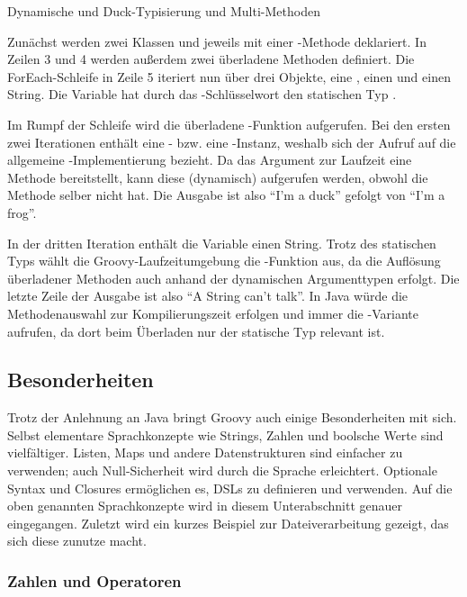 \documentclass[a4paper]{article}
\newcommand{\outquote}[1]{``{#1}''}
\newcommand{\codelisting}[3]{\begin{listing}[htp]
	\inputminted{#1}{#1/#2}
	\vspace{-3ex}
	\caption{#3}
	\label{lst:#2}
\end{listing}}
\begin{document}
\codelisting{groovy}{dynamic-typing.groovy}{Dynamische und Duck-Typisierung und Multi-Methoden}

Zunächst werden zwei Klassen  und  jeweils mit einer -Methode deklariert.
In Zeilen 3 und 4 werden außerdem zwei überladene Methoden  definiert.
Die ForEach-Schleife in Zeile 5 iteriert nun über drei Objekte, eine , einen  und einen String.
Die Variable  hat durch das -Schlüsselwort den statischen Typ .

Im Rumpf der Schleife wird die überladene -Funktion aufgerufen.
Bei den ersten zwei Iterationen enthält  eine - bzw. eine -Instanz, weshalb sich der Aufruf auf die allgemeine -Implementierung bezieht.
Da das Argument zur Laufzeit eine Methode  bereitstellt, kann diese (dynamisch) aufgerufen werden, obwohl  die Methode selber nicht hat.
Die Ausgabe ist also \outquote{I'm a duck} gefolgt von \outquote{I'm a frog}.

In der dritten Iteration enthält die Variable  einen String.
Trotz des statischen Typs  wählt die Groovy-Laufzeitumgebung die -Funktion aus, da die Auflösung überladener Methoden auch anhand der dynamischen Argumenttypen erfolgt.
Die letzte Zeile der Ausgabe ist also \outquote{A String can't talk}.
In Java würde die Methodenauswahl zur Kompilierungszeit erfolgen und immer die -Variante aufrufen, da dort beim Überladen nur der statische Typ relevant ist.

\subsection{Besonderheiten}\label{subsec:besonderheiten}

Trotz der Anlehnung an Java bringt Groovy auch einige Besonderheiten mit sich.
Selbst elementare Sprachkonzepte wie Strings, Zahlen und boolsche Werte sind vielfältiger.
Listen, Maps und andere Datenstrukturen sind einfacher zu verwenden; auch Null-Sicherheit wird durch die Sprache erleichtert.
Optionale Syntax und Closures ermöglichen es, DSLs zu definieren und verwenden.
Auf die oben genannten Sprachkonzepte wird in diesem Unterabschnitt genauer eingegangen.
Zuletzt wird ein kurzes Beispiel zur Dateiverarbeitung gezeigt, das sich diese zunutze macht.

\subsubsection{Zahlen und Operatoren}\label{subsubsec:zahlen}
\end{document}
